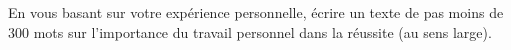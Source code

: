 
\begin{exercice}\label{exosmath-0419}

    En vous basant sur votre expérience personnelle, écrire un texte de pas moins de $300$ mots sur l'importance du travail personnel dans la réussite (au sens large).

\end{exercice}
